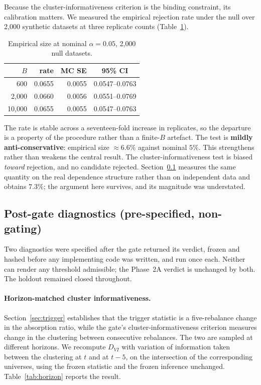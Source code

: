 \documentclass[12pt,letterpaper]{article}
\begin{document}
Because the cluster-informativeness criterion is the binding constraint, its
calibration matters. We measured the empirical rejection rate under the null over
2{,}000 synthetic datasets at three replicate counts (Table~\ref{tab:size}).

\begin{table}[htbp]
\centering
\caption{Empirical size at nominal $\alpha = 0.05$, 2{,}000 null datasets.}
\label{tab:size}
\small
\begin{tabular}{rrrc}
\toprule
$B$ & rate & MC SE & 95\% CI \\
\midrule
600     & 0.0655 & 0.0055 & 0.0547--0.0763 \\
2{,}000  & 0.0660 & 0.0056 & 0.0551--0.0769 \\
10{,}000 & 0.0655 & 0.0055 & 0.0547--0.0763 \\
\bottomrule
\end{tabular}
\end{table}

The rate is stable across a seventeen-fold increase in replicates, so the departure
is a property of the procedure rather than a finite-$B$ artefact. The test is
\textbf{mildly anti-conservative}: empirical size $\approx 6.6\%$ against nominal
$5\%$. This strengthens rather than weakens the central result. The
cluster-informativeness test is biased \emph{toward} rejection, and no candidate
rejected. Section~\ref{sec:postgate} measures the same quantity on the real dependence
structure rather than on independent data and obtains $7.3\%$; the argument here
survives, and its magnitude was understated.

\subsection{Post-gate diagnostics (pre-specified, non-gating)}
\label{sec:postgate}

Two diagnostics were specified after the gate returned its verdict, frozen and hashed
before any implementing code was written, and run once each. Neither can render any
threshold admissible; the Phase~2A verdict is unchanged by both. The holdout remained
closed throughout.

\paragraph{Horizon-matched cluster informativeness.}
Section~\ref{sec:trigger} establishes that the trigger statistic is a five-rebalance
change in the absorption ratio, while the gate's cluster-informativeness criterion
measures change in the clustering between consecutive rebalances. The two are sampled at
different horizons. We recompute $D_{VI}$ with variation of information taken between the
clustering at $t$ and at $t-5$, on the intersection of the corresponding universes, using
the frozen statistic and the frozen inference unchanged. Table~\ref{tab:horizon}
reports the result.
\end{document}
